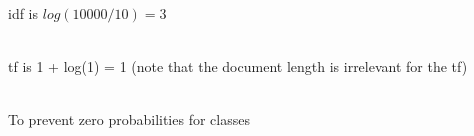 \begin{quiz}
  ~\\
  idf is $log(10000 / 10) = 3$
\end{quiz}

\begin{quiz}
  ~\\
  tf is 1 + log(1) = 1 (note that the document length is irrelevant for the tf)
\end{quiz}

\begin{quiz}
  ~\\
  To prevent zero probabilities for classes
\end{quiz}

